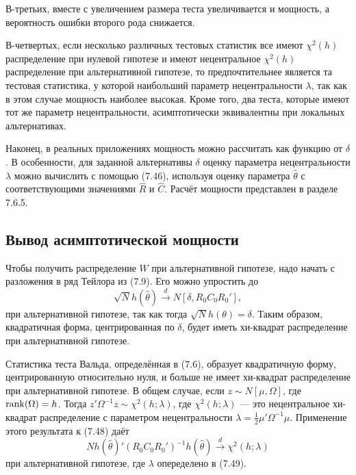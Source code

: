 В-третьих, вместе с увеличением размера теста увеличивается и мощность, а вероятность ошибки второго рода снижается.

В-четвертых, если несколько различных тестовых статистик все имеют $\chi^2(h)$ распределение при нулевой гипотезе и имеют нецентральное $\chi^2(h)$ распределение при альтернативной гипотезе, то предпочтительнее является та тестовая статистика, у которой наибольший параметр нецентральности $\lambda$, так как в этом случае мощность наиболее высокая. Кроме того, два теста, которые имеют тот же параметр нецентральности, асимптотически эквивалентны при локальных альтернативах.

Наконец, в реальных приложениях мощность можно рассчитать как функцию от $\delta$. В особенности, для заданной альтернативы $\delta$ оценку параметра нецентральности $\lambda$ можно вычислить с помощью (7.46), используя оценку параметра $\hat{\theta}$ с соответствующими значениями $\hat{R}$ и $\hat{C}$. Расчёт мощности представлен в разделе 7.6.5.

\subsection{Вывод асимптотической мощности}

Чтобы получить распределение $W$ при альтернативной гипотезе, надо начать с разложения в ряд Тейлора из (7.9). Его можно упростить до
\begin{equation}
\sqrt{N}h(\hat{\theta}) \stackrel{d}{\rightarrow} N[\delta, R_0C_0R_0'],
\end{equation}
при альтернативной гипотезе, так как тогда $\sqrt{N}h(\theta) = \delta$. Таким образом, квадратичная форма, центрированная по $\delta$, будет иметь хи-квадрат распределение при альтернативной гипотезе.

Статистика теста Вальда, определённая в (7.6), образует квадратичную форму, центрированную относительно нуля, и больше не имеет хи-квадрат распределение при альтернативной гипотезе. В общем случае, если $z \sim N[\mu, \Omega]$, где $\mathrm{rank}(\Omega) = h$. Тогда $z'\Omega^{-1}z \sim \chi^2(h; \lambda)$, где $\chi^2(h; \lambda)$ --- это нецентральное хи-квадрат распределение с параметром нецентральности $\lambda = \frac{1}{2}\mu'\Omega^{-1}\mu$. Применение этого результата к (7.48) даёт
\begin{equation}
Nh(\hat{\theta})'(R_0C_0R_0')^{-1}h(\hat{\theta}) \stackrel{d}{\rightarrow} \chi^2(h; \lambda)
\end{equation}
при альтернативной гипотезе, где $\lambda$ опеределено в (7.49).

